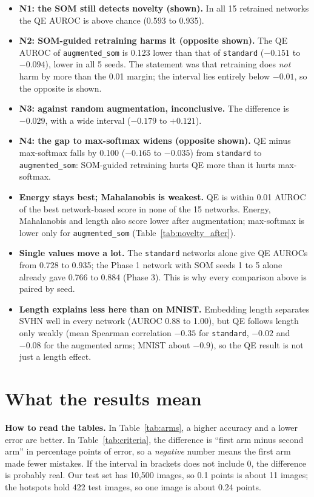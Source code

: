 \documentclass[11pt]{article}
\begin{document}
\begin{itemize}[leftmargin=1.4em, itemsep=2pt]
  \item \textbf{N1: the SOM still detects novelty (shown).} In all 15 retrained networks the QE AUROC is above chance (0.593 to 0.935).
  \item \textbf{N2: SOM-guided retraining harms it (opposite shown).} The QE AUROC of \texttt{augmented\_som} is 0.123 lower than that of \texttt{standard} ($-0.151$ to $-0.094$), lower in all 5 seeds. The statement was that retraining does \emph{not} harm by more than the 0.01 margin; the interval lies entirely below $-0.01$, so the opposite is shown.
  \item \textbf{N3: against random augmentation, inconclusive.} The difference is $-0.029$, with a wide interval ($-0.179$ to $+0.121$).
  \item \textbf{N4: the gap to max-softmax widens (opposite shown).} QE minus max-softmax falls by 0.100 ($-0.165$ to $-0.035$) from \texttt{standard} to \texttt{augmented\_som}: SOM-guided retraining hurts QE more than it hurts max-softmax.
  \item \textbf{Energy stays best; Mahalanobis is weakest.} QE is within 0.01 AUROC of the best network-based score in none of the 15 networks. Energy, Mahalanobis and length also score lower after augmentation; max-softmax is lower only for \texttt{augmented\_som} (Table~\ref{tab:novelty_after}).
  \item \textbf{Single values move a lot.} The \texttt{standard} networks alone give QE AUROCs from 0.728 to 0.935; the Phase 1 network with SOM seeds 1 to 5 alone already gave 0.766 to 0.884 (Phase 3). This is why every comparison above is paired by seed.
  \item \textbf{Length explains less here than on MNIST.} Embedding length separates SVHN well in every network (AUROC 0.88 to 1.00), but QE follows length only weakly (mean Spearman correlation $-0.35$ for \texttt{standard}, $-0.02$ and $-0.08$ for the augmented arms; MNIST about $-0.9$), so the QE result is not just a length effect.
\end{itemize}

\section{What the results mean}\label{sec:meaning}

\textbf{How to read the tables.} In Table~\ref{tab:arms}, a higher accuracy and a lower error are better. In Table~\ref{tab:criteria}, the difference is ``first arm minus second arm'' in percentage points of error, so a \emph{negative} number means the first arm made fewer mistakes. If the interval in brackets does not include 0, the difference is probably real. Our test set has 10{,}500 images, so 0.1 points is about 11 images; the hotspots hold 422 test images, so one image is about 0.24 points.
\end{document}
